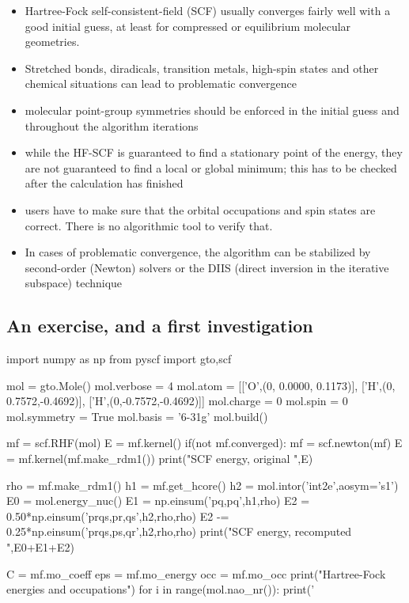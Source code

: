 \documentclass{article}
\begin{document}
\begin{itemize}
\item Hartree-Fock self-consistent-field (SCF) usually converges fairly well with a good initial guess, at least for compressed or equilibrium molecular geometries.
\item
Stretched bonds, diradicals, transition metals, high-spin states and other chemical situations can lead to problematic convergence
\item molecular point-group symmetries should be enforced in the initial guess and throughout the algorithm iterations
\item while the HF-SCF is guaranteed to find a stationary point of the energy, they are not guaranteed to find a local or global minimum; this has to be checked after the calculation has finished
\item users have to make sure that the orbital occupations and spin states are correct. There is no algorithmic tool to verify that.
\item In cases of problematic convergence, the algorithm can be stabilized by second-order (Newton) solvers \cite{siegbahn1981complete} or the DIIS (direct inversion in the iterative subspace) technique \cite{pulay1980convergence}
\end{itemize}

\subsection{An exercise, and a first investigation}

\begin{python}
import numpy as np
from   pyscf import gto,scf

mol          = gto.Mole()
mol.verbose  = 4
mol.atom    = [['O',(0, 0.0000, 0.1173)],
               ['H',(0, 0.7572,-0.4692)],
               ['H',(0,-0.7572,-0.4692)]]
mol.charge   = 0
mol.spin     = 0
mol.symmetry = True
mol.basis    = '6-31g'
mol.build()

mf = scf.RHF(mol)
E  = mf.kernel()
if(not mf.converged):
   mf = scf.newton(mf)
   E  = mf.kernel(mf.make_rdm1())
print("SCF energy, original   ",E)

rho = mf.make_rdm1()
h1  = mf.get_hcore()
h2  = mol.intor('int2e',aosym='s1')
E0  = mol.energy_nuc()
E1  = np.einsum('pq,pq',h1,rho)
E2  = 0.50*np.einsum('prqs,pr,qs',h2,rho,rho)
E2 -= 0.25*np.einsum('prqs,ps,qr',h2,rho,rho)
print("SCF energy, recomputed ",E0+E1+E2)

C   = mf.mo_coeff
eps = mf.mo_energy
occ = mf.mo_occ
print("Hartree-Fock energies and occupations")
for i in range(mol.nao_nr()):
    print('%
\end{python}
\end{document}
